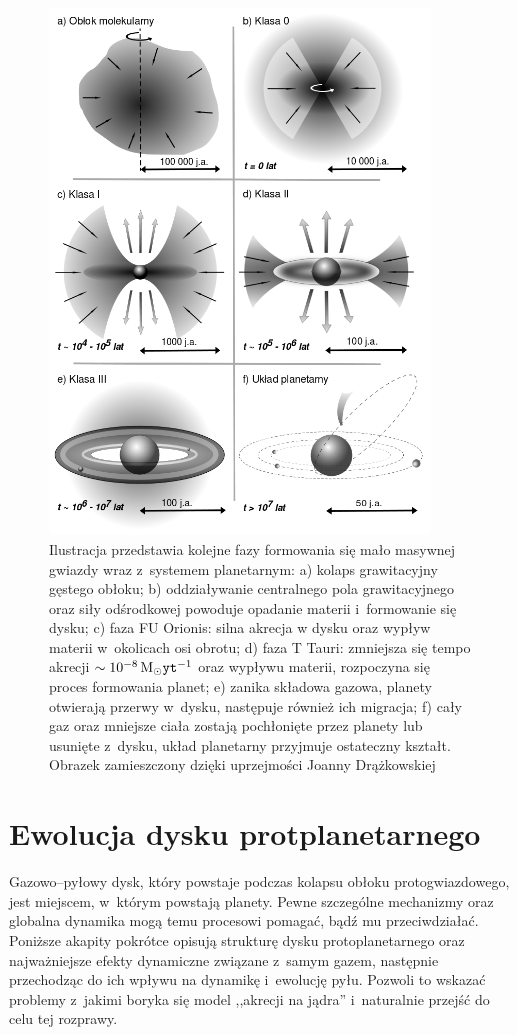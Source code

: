 \begin{figure}[p]
\centering 
\includegraphics[width=0.9\textwidth]{figures/planetformation.png}
\caption{Ilustracja przedstawia kolejne fazy formowania się mało masywnej gwiazdy
   wraz z~systemem planetarnym: a) kolaps grawitacyjny gęstego obłoku; b)
   oddziaływanie centralnego pola grawitacyjnego oraz siły odśrodkowej powoduje
   opadanie materii i~formowanie się dysku; c) faza FU Orionis: silna akrecja w
   dysku oraz wypływ materii w~okolicach osi obrotu; d) faza T Tauri: zmniejsza
   się tempo akrecji $\sim 10^{-8}\hbox{$\mathrm{\thinspace M_{\odot}}$}{\texttt{yt}}^{-1}$ oraz wypływu materii,
   rozpoczyna się proces formowania planet; e) zanika składowa gazowa, planety
otwierają przerwy w~dysku, następuje również ich migracja; f) cały gaz oraz
mniejsze ciała zostają pochłonięte przez planety lub usunięte z~dysku, układ
planetarny przyjmuje ostateczny kształt. Obrazek zamieszczony dzięki uprzejmości
Joanny Drążkowskiej}

\label{fig:planet}
\end{figure}

\section{Ewolucja dysku protplanetarnego}
Gazowo--pyłowy dysk, który powstaje podczas kolapsu obłoku protogwiazdowego, jest
miejscem, w~którym powstają planety. Pewne szczególne mechanizmy oraz globalna
dynamika mogą temu procesowi pomagać, bądź mu przeciwdziałać. Poniższe akapity
pokrótce opisują strukturę dysku protoplanetarnego oraz najważniejsze efekty
dynamiczne związane z~samym gazem, następnie przechodząc do ich wpływu na
dynamikę i~ewolucję pyłu. Pozwoli to wskazać problemy z~jakimi boryka się model
,,akrecji na jądra'' i~naturalnie przejść do celu tej rozprawy.


